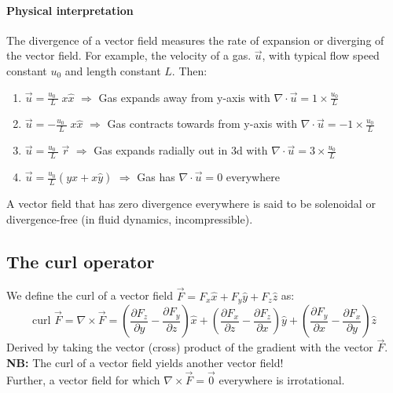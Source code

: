 \documentclass[11pt]{article}
\begin{document}
        \paragraph{Physical interpretation} The divergence of a vector field measures the rate of expansion or diverging of the
        vector field.
        For example, the velocity of a gas. $\vec{u}$, with typical flow speed constant $u_0$ and length constant $L$.
        Then:
        \begin{enumerate}
            \item $\vec{u} = \frac{u_0\;}{L} \; x \hat{x}$ $\Rightarrow$ Gas expands away from y-axis with $ \nabla \cdot \vec{u} = 1 \times \frac{u_0}{L}$
            \item $\vec{u} = -\frac{u_0\;}{L} \; x \hat{x}$ $\Rightarrow$ Gas contracts towards from y-axis with $ \nabla \cdot \vec{u} = -1 \times \frac{u_0}{L}$
            \item $\vec{u} = \frac{u_0\;}{L} \; \vec{r}$ $\Rightarrow$ Gas expands radially out in 3d with $ \nabla \cdot \vec{u} = 3 \times \frac{u_0}{L}$
            \item $\vec{u} = \frac{u_0}{L}({y\hat{x} + x \hat{y}})$ $\Rightarrow$ Gas has $\nabla \cdot \vec{u} = 0$ everywhere
        \end{enumerate}
        A vector field that has zero divergence everywhere is said to be solenoidal or divergence-free (in fluid dynamics, incompressible).
        \subsection{The curl operator}\label{subsec:the-curl-operator}
        We define the curl of a vector field $\vec{F} = F_x \hat{x} + F_y \hat{y} + F_z \hat{z}$ as:
        \begin{equation}
            \label{eq:equation3}
            \text{curl } \vec{F} = \nabla \times \vec{F} = \left(\frac{\partial F_z}{\partial y} - \frac{\partial F_y}{\partial z}\right)\hat{x} + \left(\frac{\partial F_x}{\partial z} - \frac{\partial F_z}{\partial x}\right)\hat{y} + \left(\frac{\partial F_y}{\partial x} - \frac{\partial F_x}{\partial y}\right)\hat{z}
        \end{equation}
        Derived by taking the vector (cross) product of the gradient with the vector $\vec{F}$.\\
        \textbf{NB: } The curl of a vector field yields another vector field! \\
        Further, a vector field for which $\nabla \times \vec{F} = \vec{0}$ everywhere is irrotational.\\
\end{document}
